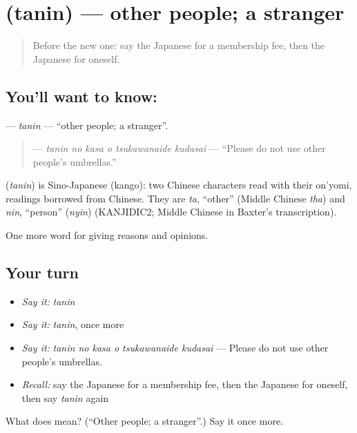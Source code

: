 \section[\texorpdfstring{\ja{たにん} (tanin)}{たにん (tanin)}]{ (tanin) — other people; a stranger}

\label{lesson:JA-C335-tanin}



\begin{quote}
Before the new one: say the Japanese for a membership fee, then the Japanese for oneself.
\end{quote}

\subsection*{You'll want to know: }
\textbf{} — \emph{tanin} — \textquotedblleft{}other people; a stranger\textquotedblright{}.

\begin{quote}
\textbf{   } — \emph{tanin no kasa o tsukawanaide kudasai} — \textquotedblleft{}Please do not use other people's umbrellas.\textquotedblright{}
\end{quote}

\begin{cousinweb}
\textbf{} (\emph{tanin}) is Sino-Japanese (kango): two Chinese characters read with their on'yomi, readings borrowed from Chinese. They are \emph{ta}, \textquotedblleft{}other\textquotedblright{} (Middle Chinese \emph{tha}) and \emph{nin}, \textquotedblleft{}person\textquotedblright{} (\emph{nyin}) (KANJIDIC2; Middle Chinese in Baxter's transcription).
\end{cousinweb}

\begin{grammarlens}[title={What you've built}]
One more word for giving reasons and opinions.
\end{grammarlens}

\subsection*{Your turn}
\begin{itemize}
\raggedright
  \item \emph{Say it:} \emph{tanin}
  \item \emph{Say it:} \emph{tanin}, once more
  \item \emph{Say it:} \emph{tanin no kasa o tsukawanaide kudasai} — Please do not use other people's umbrellas.
  \item \emph{Recall:} say the Japanese for a membership fee, then the Japanese for oneself, then say \emph{tanin} again
\end{itemize}

\begin{tcolorbox}[breakable,colback=teal!4,colframe=teal!35!black,title={Before you move on}]
What does  mean? (\textquotedblleft{}Other people; a stranger\textquotedblright{}.) Say it once more.
\end{tcolorbox}
